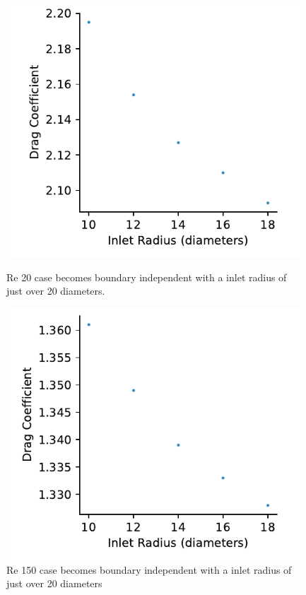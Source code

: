 \documentclass[10pt,english]{article}
\begin{document}
\begin{figure}[h!]
\centering
\begin{minipage}{.47\textwidth}
  \centering
\includegraphics[trim={0.0cm 0cm 0.0cm 0cm},clip,width=0.98\textwidth]{boundary20}
\vspace{3pt}
\caption{Re 20 case becomes boundary independent with a inlet radius of just over 20 diameters.}
\label{f:boundary20}
\end{minipage}%
\hspace{10pt}
\begin{minipage}{.47\textwidth}
  \centering
\includegraphics[trim={0.0cm 0cm 0.0cm 0cm},clip,width=0.98\textwidth]{boundary150}
\caption{Re 150 case becomes boundary independent with a inlet radius of just over 20 diameters}
\label{f:boundary150}
\end{minipage}
\end{figure}
\end{document}
